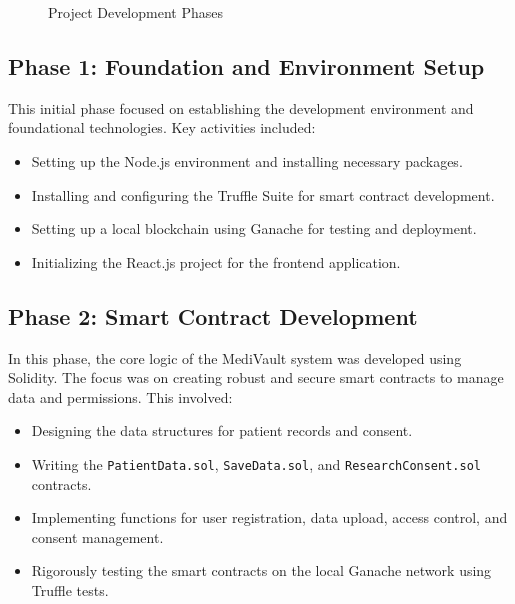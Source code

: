\begin{figure}[h!]
\centering
{}
\caption{Project Development Phases}
\label{fig:roadmap}
\end{figure}

\subsection{Phase 1: Foundation and Environment Setup}
This initial phase focused on establishing the development environment and foundational technologies. Key activities included:
\begin{itemize}
    \item Setting up the Node.js environment and installing necessary packages.
    \item Installing and configuring the Truffle Suite for smart contract development.
    \item Setting up a local blockchain using Ganache for testing and deployment.
    \item Initializing the React.js project for the frontend application.
\end{itemize}

\subsection{Phase 2: Smart Contract Development}
In this phase, the core logic of the MediVault system was developed using Solidity. The focus was on creating robust and secure smart contracts to manage data and permissions. This involved:
\begin{itemize}
    \item Designing the data structures for patient records and consent.
    \item Writing the \texttt{PatientData.sol}, \texttt{SaveData.sol}, and \texttt{ResearchConsent.sol} contracts.
    \item Implementing functions for user registration, data upload, access control, and consent management.
    \item Rigorously testing the smart contracts on the local Ganache network using Truffle tests.
\end{itemize}

